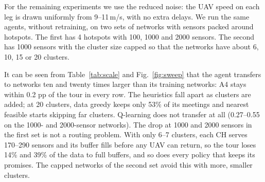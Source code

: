 \documentclass[conference]{IEEEtran}
\begin{document}
\begin{table}[t]
\caption{PDR on hotspot networks with the reduced noise (mean of ten networks per row; cluster
counts in parentheses are the range over the ten networks). The PPO agent is trained only on
100-sensor networks with even spread.}\label{tab:scale}
\centering\small
\setlength{\tabcolsep}{3pt}
\end{table}

For the remaining experiments we use the reduced noise: the UAV speed on each leg is drawn
uniformly from 9--11\,m/s, with no extra delays. We run the same agents, without retraining, on
two sets of networks with sensors packed around hotspots. The first has 4 hotspots with 100,
1000 and 2000 sensors. The second has 1000 sensors with the cluster size capped so that the
networks have about 6, 10, 15 or 20 clusters.

It can be seen from Table~\ref{tab:scale} and Fig.~\ref{fig:sweep} that the agent transfers to networks ten and twenty
times larger than its training networks: A4 stays within 0.2 pp of the tour in every row. The
heuristics fall apart as clusters are added; at 20 clusters, data greedy keeps only 53\% of its
meetings and nearest feasible starts skipping far clusters. Q-learning does not transfer at all
(0.27--0.55 on the 1000- and 2000-sensor networks). The drop at 1000 and 2000 sensors in the
first set is not a routing problem. With only 6--7 clusters, each CH serves 170--290 sensors and
its buffer fills before any UAV can return, so the tour loses 14\% and 39\% of the data to full
buffers, and so does every policy that keeps its promises. The capped networks of the second set
avoid this with more, smaller clusters.
\end{document}
